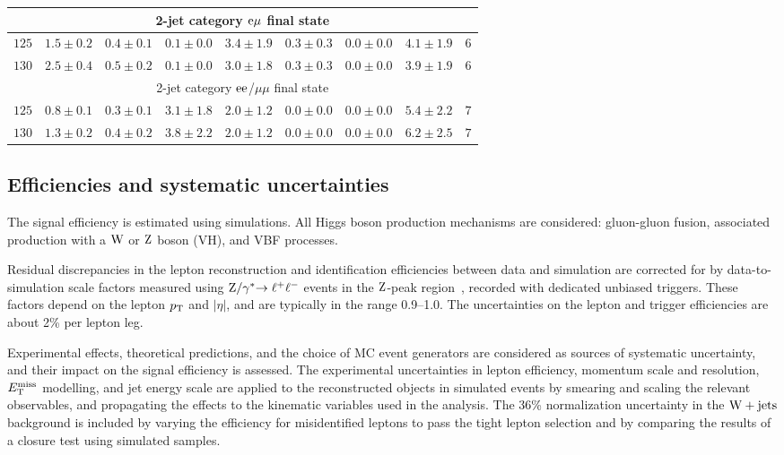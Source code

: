 \documentclass[11pt,twoside,a4paper,cmspaper,final,collab]{cms-tdr}
\begin{document}
\begin{table}[h!t]
\begin{center}
{\begin{tabular} {l|c|c|c|c|c|c|c|c}
\hline
\multicolumn{9}{c}{2-jet category  $\mathrm{e}\mu$ final state} \\
\hline
 $125$ & $1.5\pm0.2$ & $0.4\pm0.1$ & $0.1\pm0.0$ & $3.4\pm1.9$ & $0.3\pm0.3$ & $0.0\pm0.0$ & $4.1\pm1.9$ & $6$ \\
 $130$ & $2.5\pm0.4$ & $0.5\pm0.2$ & $0.1\pm0.0$ & $3.0\pm1.8$ & $0.3\pm0.3$ & $0.0\pm0.0$ & $3.9\pm1.9$ & $6$ \\
\hline
\multicolumn{9}{c}{2-jet category $\mathrm{e}\mathrm{e}$/$\mu\mu$ final state} \\
\hline
 $125$ & $0.8\pm0.1$ & $0.3\pm0.1$ & $3.1\pm1.8$ & $2.0\pm1.2$ & $0.0\pm0.0$ & $0.0\pm0.0$ & $5.4\pm2.2$ & $7$ \\
 $130$ & $1.3\pm0.2$ & $0.4\pm0.2$ & $3.8\pm2.2$ & $2.0\pm1.2$ & $0.0\pm0.0$ & $0.0\pm0.0$ & $6.2\pm2.5$ & $7$ \\
\hline
  \end{tabular}
  }
  \end{center}
\end{table}

\subsection{Efficiencies and systematic uncertainties}
\label{sec:systematics}

The signal efficiency is estimated using simulations.
All Higgs boson production mechanisms are considered:
gluon-gluon fusion, associated production  with
a $\mathrm{W}$ or $\mathrm{Z}$ boson (VH), and VBF processes.

Residual discrepancies in the lepton reconstruction and identification
efficiencies between data and simulation are corrected for by
data-to-simulation scale factors measured using $\mathrm{Z}/\gamma^*{\to \ell^+\ell^-}$ events in the
$\mathrm{Z}$-peak region~\cite{CMS:2011aa}, recorded with dedicated unbiased triggers.
These factors depend on the lepton $p_{\mathrm{T}}$ and $|\eta|$, and
are typically in the range 0.9--1.0. The uncertainties on the lepton and
trigger efficiencies are about 2\% per lepton leg.

Experimental effects, theoretical predictions, and the choice of MC event
generators are considered as sources of systematic uncertainty, and their impact on the signal
efficiency is assessed.
The experimental uncertainties in lepton efficiency, momentum scale and resolution, $E_{\mathrm{T}}^{\text{miss}}$
modelling, and jet energy scale are applied to the reconstructed objects in simulated events by smearing
and scaling the relevant observables, and propagating the effects to the kinematic variables used
in the analysis.
The 36\% normalization uncertainty in the $\mathrm{W}+\text{jets}$ background is included by varying
the efficiency for misidentified leptons to pass the tight lepton
selection and by comparing the results of a closure test using simulated samples.
\end{document}

